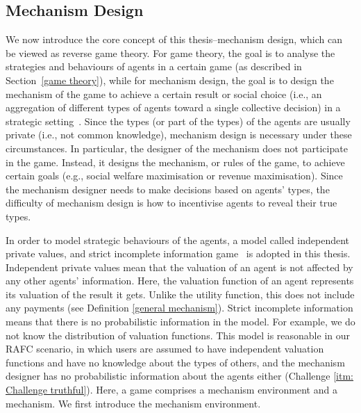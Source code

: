 \documentclass[11pt]{phdthesis}
\begin{document}
\subsection{Mechanism Design} \label{mechanism design}

We now introduce the core concept of this thesis–mechanism design, which can be viewed as reverse game theory. For game theory, the goal is to analyse the strategies and behaviours of agents in a certain game (as described in Section~\ref{game theory}), while for mechanism design, the goal is to design the mechanism of the game to achieve a certain result or social choice (i.e., an aggregation of different types of agents toward a single collective decision) in a strategic setting~\citep{nisan2007algorithmic}. Since the types (or part of the types) of the agents are usually private (i.e., not common knowledge), mechanism design is necessary under these circumstances. In particular, the designer of the mechanism does not participate in the game. Instead, it designs the mechanism, or rules of the game, to achieve certain goals (e.g., social welfare maximisation or revenue maximisation). Since the mechanism designer needs to make decisions based on agents' types, the difficulty of mechanism design is how to incentivise agents to reveal their true types. 

In order to model strategic behaviours of the agents, a model called independent private values, and strict incomplete information game~\citep[Chapter 9]{nisan2007algorithmic} is adopted in this thesis. Independent private values mean that the valuation of an agent is not affected by any other agents' information. Here, the valuation function of an agent represents its valuation of the result it gets. Unlike the utility function, this does not include any payments (see Definition \ref{general mechanism}). 
Strict incomplete information means that there is no probabilistic information in the model. For example, we do not know the distribution of valuation functions. This model is reasonable in our RAFC scenario, in which users are assumed to have independent valuation functions and have no knowledge about the types of others, and the mechanism designer has no probabilistic information about the agents either (Challenge \ref{itm: Challenge truthful}). Here, a game comprises a mechanism environment and a mechanism. We first introduce the mechanism environment.
\end{document}
